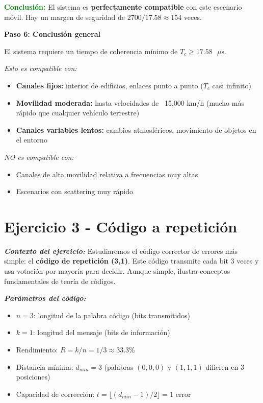 \documentclass[11pt,a4paper]{article}
\begin{document}
\textcolor{green}{\textbf{Conclusi\'on:}} El sistema es \textbf{perfectamente compatible} con este escenario m\'ovil. Hay un margen de seguridad de $2700/17.58 \approx 154$ veces.

\textbf{Paso 6: Conclusi\'on general}

El sistema requiere un tiempo de coherencia m\'inimo de $\boxed{T_c \geq 17.58 \text{ }\mu\text{s}}$. 

\textit{Esto es compatible con:}
\begin{itemize}
    \item \textbf{Canales fijos:} interior de edificios, enlaces punto a punto ($T_c$ casi infinito)
    \item \textbf{Movilidad moderada:} hasta velocidades de ~15,000 km/h (mucho m\'as r\'apido que cualquier veh\'iculo terrestre)
    \item \textbf{Canales variables lentos:} cambios atmosf\'ericos, movimiento de objetos en el entorno
\end{itemize}

\textit{NO es compatible con:}
\begin{itemize}
    \item Canales de alta movilidad relativa a frecuencias muy altas
    \item Escenarios con scattering muy r\'apido
\end{itemize}

\newpage
\section*{Ejercicio 3 - C\'odigo a repetici\'on}

\textit{\textbf{Contexto del ejercicio:}} Estudiaremos el c\'odigo corrector de errores m\'as simple: el \textbf{c\'odigo de repetici\'on (3,1)}. Este c\'odigo transmite cada bit 3 veces y usa votaci\'on por mayor\'ia para decidir. Aunque simple, ilustra conceptos fundamentales de teor\'ia de c\'odigos.

\textit{\textbf{Par\'ametros del c\'odigo:}}
\begin{itemize}
    \item $n = 3$: longitud de la palabra c\'odigo (bits transmitidos)
    \item $k = 1$: longitud del mensaje (bits de informaci\'on)  
    \item Rendimiento: $R = k/n = 1/3 \approx 33.3\%$
    \item Distancia m\'inima: $d_{min} = 3$ (palabras $(0,0,0)$ y $(1,1,1)$ difieren en 3 posiciones)
    \item Capacidad de correcci\'on: $t = \lfloor (d_{min}-1)/2 \rfloor = 1$ error
\end{itemize}
\end{document}
